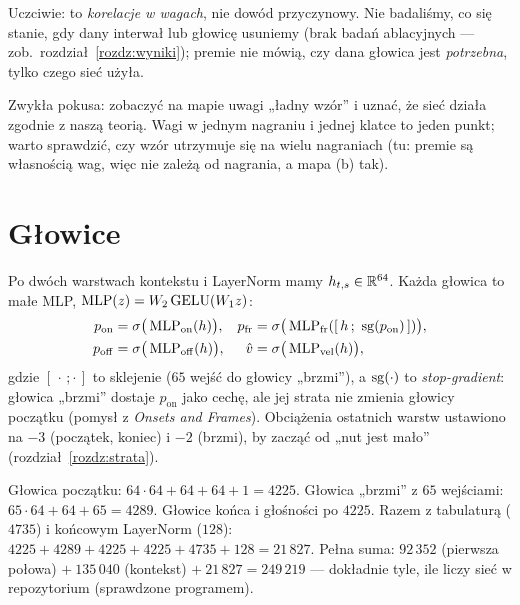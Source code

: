 Uczciwie: to \emph{korelacje w wagach}, nie dowód przyczynowy. Nie badaliśmy, co się stanie, gdy dany interwał lub głowicę usuniemy (brak badań ablacyjnych --- zob.\ rozdział~\ref{rozdz:wyniki}); premie nie mówią, czy dana głowica jest \emph{potrzebna}, tylko czego sieć użyła.

\begin{pulapka}
Zwykła pokusa: zobaczyć na mapie uwagi „ładny wzór” i uznać, że sieć działa zgodnie z naszą teorią. Wagi w jednym nagraniu i jednej klatce to jeden punkt; warto sprawdzić, czy wzór utrzymuje się na wielu nagraniach (tu: premie są własnością wag, więc nie zależą od nagrania, a mapa (b) tak).
\end{pulapka}

\section{Głowice}

Po dwóch warstwach kontekstu i LayerNorm mamy $h_{t,s}\in\mathbb{R}^{64}$. Każda głowica to małe MLP, $\operatorname{MLP}(z)=W_2\operatorname{GELU}(W_1z)$:
\begin{align*}
p_\mathrm{on} &= \sigma\big(\MLP_\mathrm{on}(h)\big), & p_\mathrm{fr} &= \sigma\big(\MLP_\mathrm{fr}([\,h\,;\ \sg(p_\mathrm{on})\,])\big),\\
p_\mathrm{off} &= \sigma\big(\MLP_\mathrm{off}(h)\big), & \hat v &= \sigma\big(\MLP_\mathrm{vel}(h)\big),
\end{align*}
gdzie $[\,\cdot\,;\cdot\,]$ to sklejenie ($65$ wejść do głowicy „brzmi”), a $\operatorname{sg}(\cdot)$ to \emph{stop-gradient}: głowica „brzmi” dostaje $p_\mathrm{on}$ jako cechę, ale jej strata nie zmienia głowicy początku (pomysł z \emph{Onsets and Frames}).
Obciążenia ostatnich warstw ustawiono na $-3$ (początek, koniec) i $-2$ (brzmi), by zacząć od „nut jest mało” (rozdział~\ref{rozdz:strata}).

\begin{naliczbach}
Głowica początku: $64\cdot64+64+64+1=4225$. Głowica „brzmi” z $65$ wejściami: $65\cdot64+64+65=4289$. Głowice końca i głośności po $4225$. Razem z tabulaturą ($4735$) i końcowym LayerNorm ($128$): $4225+4289+4225+4225+4735+128=21\,827$.
Pełna suma: $92\,352$ (pierwsza połowa) $+\ 135\,040$ (kontekst) $+\ 21\,827=249\,219$ --- dokładnie tyle, ile liczy sieć w repozytorium (sprawdzone programem).
\end{naliczbach}

